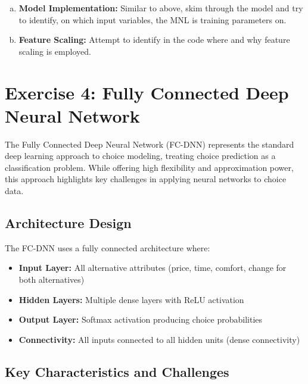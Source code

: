\documentclass[11pt]{article}
\begin{document}
\begin{enumerate}[(a)]
\item \textbf{Model Implementation:} Similar to above, skim through the model and try to identify, on which input variables, the MNL is training parameters on.
\item \textbf{Feature Scaling:} Attempt to identify in the code where and why feature scaling is employed.
\end{enumerate}

\section*{Exercise 4: Fully Connected Deep Neural Network}

\begin{center}
\end{center}

The Fully Connected Deep Neural Network (FC-DNN) represents the standard deep learning approach to choice modeling, treating choice prediction as a classification problem. While offering high flexibility and approximation power, this approach highlights key challenges in applying neural networks to choice data.

\subsection*{Architecture Design}

The FC-DNN uses a fully connected architecture where:
\begin{itemize}
\item \textbf{Input Layer:} All alternative attributes (price, time, comfort, change for both alternatives)
\item \textbf{Hidden Layers:} Multiple dense layers with ReLU activation
\item \textbf{Output Layer:} Softmax activation producing choice probabilities
\item \textbf{Connectivity:} All inputs connected to all hidden units (dense connectivity)
\end{itemize}

\subsection*{Key Characteristics and Challenges}
\end{document}

